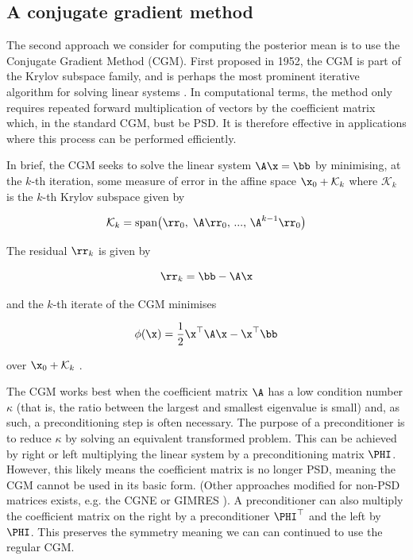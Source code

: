 \subsection{A conjugate gradient method}

The second approach we consider for computing the posterior mean is to use the Conjugate Gradient Method (CGM). First proposed in 1952, the CGM is part of the Krylov subspace family, and is perhaps the most prominent iterative algorithm for solving linear systems \citep{Hestenes1952}. In computational terms, the method only requires repeated forward multiplication of vectors by the coefficient matrix which, in the standard CGM, bust be PSD. It is therefore effective in applications where this process can be performed efficiently. 

In brief, the CGM seeks to solve the linear system $\A \x = \bb$ by minimising, at the $k$-th iteration, some measure of error in the affine space $\x_0 + \mathcal{K}_k$ where $\mathcal{K}_k$ is the $k$-th Krylov subspace given by  

$$
\mathcal{K}_k = \text{span}\big(\rr_0, \; \A \rr_0, \, ..., \, \A^{k-1} \rr_0 \big)
$$

The residual $\rr_k$ is given by 

$$
\rr_k = \bb - \A \x
$$

and the $k$-th iterate of the CGM minimises 

$$
\phi(\x) = \frac{1}{2} \x^\top \A \x  - \x^\top \bb
$$

over $\x_0 + \mathcal{K}_k$ \citep{Kelley1995}. 

The CGM works best when the coefficient matrix $\A$ has a low condition number $\kappa$ (that is, the ratio between the largest and smallest eigenvalue is small) and, as such, a preconditioning step is often necessary. The purpose of a preconditioner is to reduce $\kappa$ by solving an equivalent transformed problem. This can be achieved by right or left multiplying the linear system by a preconditioning matrix $\PHI$. However, this likely means the coefficient matrix is no longer PSD, meaning the CGM cannot be used in its basic form. (Other approaches modified for non-PSD matrices exists, e.g. the CGNE or GIMRES \citep{Elman1982, Saad1986}). A preconditioner can also multiply the coefficient matrix on the right by a preconditioner $\PHI^\top$ and the left by $\PHI$. This preserves the symmetry meaning we can can continued to use the regular CGM. 

